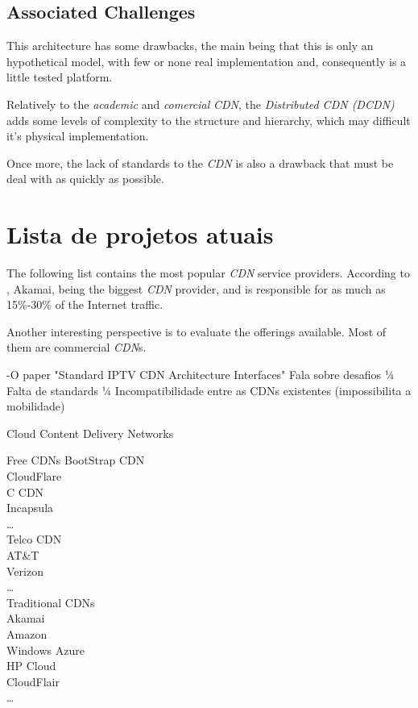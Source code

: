 \documentclass{llncs}
\begin{document}
\subsection{Associated Challenges}

This architecture has some drawbacks, the main being that this is
only an hypothetical model, with few or none real implementation
and, consequently is a little tested platform.

Relatively to the \emph{academic} and \emph{comercial} \textit{CDN},
the \emph{Distributed CDN (DCDN)} adds some levels of complexity to the structure and
hierarchy, which may difficult it's physical implementation.

Once more, the lack of standards to the \textit{CDN} is also
a drawback that must be deal with as quickly as possible.




\section{Lista de projetos atuais}							%

The following list contains the most popular \textit{CDN} service providers. According to \cite{reuters}, Akamai, being the biggest \textit{CDN} provider, and is responsible for as much as 15\%-30\% of the Internet traffic.

Another interesting perspective is to evaluate the offerings available. Most of them are commercial \textit{CDN}s. 


-O paper "Standard IPTV CDN Architecture Interfaces" Fala sobre desafios
		¼ Falta de standards
		¼ Incompatibilidade entre as CDNs existentes (impossibilita a mobilidade)

	
\if
	Cloud Content Delivery Networks
	
		Free CDNs
			BootStrap CDN\\
			CloudFlare\\
			C CDN\\
			Incapsula\\
			\dots\\
		Telco CDN\\
			AT\&T\\
			Verizon\\
			\dots\\
		Traditional CDNs\\
			Akamai\\
				Amazon\\
			Windows Azure\\
			HP Cloud\\
			CloudFlair\\
			\dots 
\end{document}
